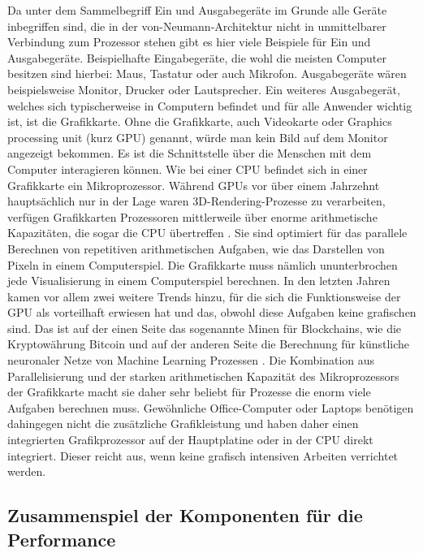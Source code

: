 Da unter dem Sammelbegriff Ein und Ausgabegeräte im Grunde alle Geräte inbegriffen sind, die in der von-Neumann-Architektur nicht in unmittelbarer Verbindung zum Prozessor stehen gibt es hier viele Beispiele für Ein und Ausgabegeräte.
Beispielhafte Eingabegeräte, die wohl die meisten Computer besitzen sind hierbei: Maus, Tastatur oder auch Mikrofon.
Ausgabegeräte wären beispielsweise Monitor, Drucker oder Lautsprecher.
Ein weiteres Ausgabegerät, welches sich typischerweise in Computern befindet und für alle Anwender wichtig ist, ist die Grafikkarte. Ohne die Grafikkarte, auch Videokarte oder Graphics processing unit (kurz GPU) genannt, würde man kein Bild auf dem Monitor angezeigt bekommen. Es ist die Schnittstelle über die Menschen mit dem Computer interagieren können. Wie bei einer CPU befindet sich in einer Grafikkarte ein Mikroprozessor. Während GPUs vor über einem Jahrzehnt hauptsächlich nur in der Lage waren 3D-Rendering-Prozesse zu verarbeiten, verfügen Grafikkarten Prozessoren mittlerweile über enorme arithmetische Kapazitäten, die sogar die CPU übertreffen \cite{owens2008}. Sie sind optimiert für das parallele Berechnen von repetitiven arithmetischen Aufgaben, wie das Darstellen von Pixeln in einem Computerspiel. Die Grafikkarte muss nämlich ununterbrochen jede Visualisierung in einem Computerspiel berechnen. In den letzten Jahren kamen vor allem zwei weitere Trends hinzu, für die sich die Funktionsweise der GPU als vorteilhaft erwiesen hat und das, obwohl diese Aufgaben keine grafischen sind. Das ist auf der einen Seite das sogenannte Minen für Blockchains, wie die Kryptowährung Bitcoin und auf der anderen Seite die Berechnung für künstliche neuronaler Netze von Machine Learning Prozessen \cite{schlegel2015} \cite{taylor2017}. Die Kombination aus Parallelisierung und der starken arithmetischen Kapazität des Mikroprozessors der Grafikkarte macht sie daher sehr beliebt für Prozesse die enorm viele Aufgaben berechnen muss.
Gewöhnliche Office-Computer oder Laptops benötigen dahingegen nicht die zusätzliche Grafikleistung und haben daher einen integrierten Grafikprozessor auf der Hauptplatine oder in der CPU direkt integriert. Dieser reicht aus, wenn keine grafisch intensiven Arbeiten verrichtet werden.


\subsection{Zusammenspiel der Komponenten für die Performance}
\label{subsec:together}

